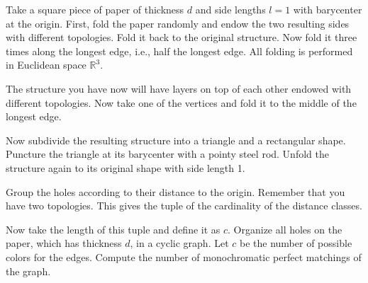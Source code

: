 Take a square piece of paper of thickness $d$ and side lengths $l=1$ with barycenter at the origin. First, fold the paper randomly and endow the two resulting sides with different topologies. Fold it back to the original structure. Now fold it three times along the longest edge, i.e., half the longest edge. All folding is performed in Euclidean space $\mathbb R^3$.

The structure you have now will have layers on top of each other endowed with different topologies. Now take one of the vertices and fold it to the middle of the longest edge.

Now subdivide the resulting structure into a triangle and a rectangular shape. Puncture the triangle at its barycenter with a pointy steel rod. Unfold the structure again to its original shape with side length 1.

Group the holes according to their distance to the origin. Remember that you have two topologies. This gives the tuple of the cardinality of the distance classes.

Now take the length of this tuple and define it as $c$. Organize all holes on the paper, which has thickness $d$, in a cyclic graph. Let $c$ be the number of possible colors for the edges.
Compute the number of monochromatic perfect matchings of the graph.
